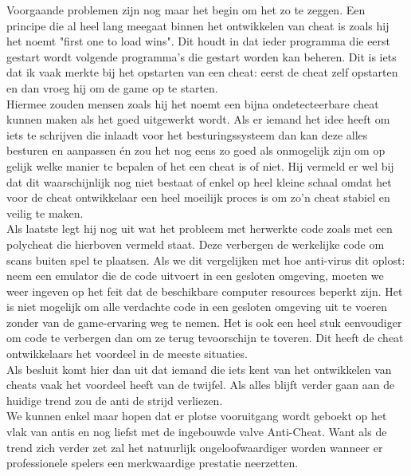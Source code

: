 \documentclass[pdftex,a4paper,12pt,twoside]{report}
\begin{document}
Voorgaande problemen zijn nog maar het begin om het zo te zeggen. Een principe die al heel lang meegaat binnen het ontwikkelen van \gls{cheat} is zoals hij het noemt "first one to load wins". Dit houdt in dat ieder programma die eerst gestart wordt volgende programma's die gestart worden kan beheren. Dit is iets dat ik vaak merkte bij het opstarten van een \gls{cheat}: eerst de \gls{cheat} zelf opstarten en dan vroeg hij om de game op te starten.
\\

Hiermee zouden mensen zoals hij het noemt een bijna ondetecteerbare \gls{cheat} kunnen maken als het goed uitgewerkt wordt. Als er iemand het idee heeft om iets te schrijven die inlaadt voor het besturingssysteem dan kan deze alles besturen en aanpassen én zou het nog eens zo goed als onmogelijk zijn om op gelijk welke manier te bepalen of het een \gls{cheat} is of niet. Hij vermeld er wel bij dat dit waarschijnlijk nog niet bestaat of enkel op heel kleine schaal omdat het voor de \gls{cheat} ontwikkelaar een heel moeilijk proces is om zo'n \gls{cheat} stabiel en veilig te maken.
\\

Als laatste legt hij nog uit wat het probleem met herwerkte code zoals met een poly\gls{cheat} die hierboven vermeld staat. Deze verbergen de werkelijke code om scans buiten spel te plaatsen. Als we dit vergelijken met hoe anti-virus dit oplost: neem een emulator die de code uitvoert in een gesloten omgeving, moeten we weer ingeven op het feit dat de beschikbare computer resources beperkt zijn. Het is niet mogelijk om alle verdachte code in een gesloten omgeving uit te voeren zonder van de game-ervaring weg te nemen. Het is ook een heel stuk eenvoudiger om code te verbergen dan om ze terug tevoorschijn te toveren. Dit heeft de \gls{cheat} ontwikkelaars het voordeel in de meeste situaties.
\\

Als besluit komt hier dan uit dat iemand die iets kent van het ontwikkelen van \gls{cheat}s vaak het voordeel heeft van de twijfel. Als alles blijft verder gaan aan de huidige trend zou de \gls{anti} de strijd verliezen. 
\\

We kunnen enkel maar hopen dat er plotse vooruitgang wordt geboekt op het vlak van \gls{anti}s en nog liefst met de ingebouwde \gls{valve} Anti-Cheat. Want als de trend zich verder zet zal het natuurlijk ongeloofwaardiger worden wanneer er professionele spelers een merkwaardige prestatie neerzetten. 
\citep{debuglog}
\end{document}
